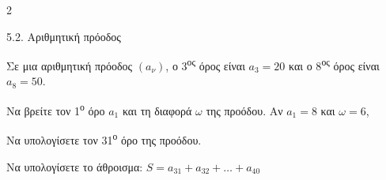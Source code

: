 \begin{ylh}{2}
    \item 5.2. Αριθμητική πρόοδος
\end{ylh}
Σε μια αριθμητική πρόοδος $(a_\nu)$, ο 3\textsuperscript{ος} όρος είναι $a_3 = 20$ και ο 8\textsuperscript{ος} όρος είναι $a_8 = 50$.

\begin{alist}
\item Να βρείτε τον 1\textsuperscript{ο} όρο $a_1$ και τη διαφορά $\omega$ της προόδου.
Αν $a_1 = 8$ και $\omega = 6$,

\item Να υπολογίσετε τον 31\textsuperscript{ο} όρο της προόδου.
\item Να υπολογίσετε το άθροισμα: $S = a_{31} + a_{32} + \dots + a_{40}$
\end{alist}

